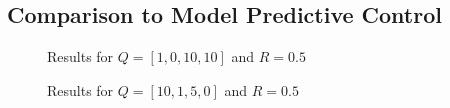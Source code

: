 \subsection{Comparison to Model Predictive Control}\label{sec:prob33}




\begin{figure}[htbp]
	\centering
	\caption{Results for $Q=[1,0,10,10]$ and $R=0.5$}
	\label{fig:problem3_LQR[1,0,10,10]}
\end{figure}


\begin{figure}[htbp]
	\centering
	\caption{Results for $Q=[10,1,5,0]$ and $R=0.5$}
	\label{fig:problem3_LQR[10,1,5,0]}
\end{figure}
